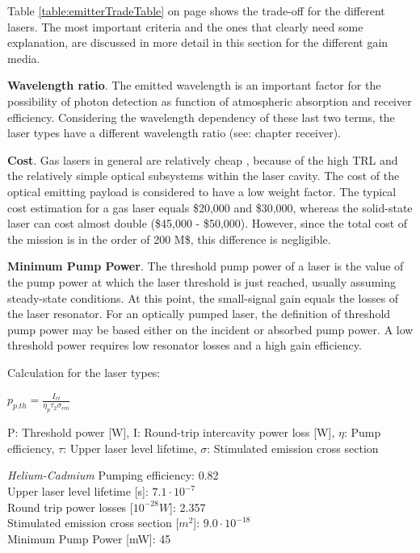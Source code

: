 Table \ref{table:emitterTradeTable} on page \pageref{table:emitterTradeTable} shows the trade-off for the different \acs{laser}s. The most important  criteria and the ones that clearly need some explanation, are discussed in more detail in this section for the different gain media. 
	
\textbf{Wavelength ratio}. The emitted wavelength is an important factor for the possibility of photon detection as function of atmospheric absorption and receiver efficiency. Considering the wavelength dependency of these last two terms, the laser types have a different wavelength ratio (see: chapter receiver).

\textbf{Cost}. Gas \acs{laser}s in general are relatively cheap , because of the high \ac{TRL} and the relatively simple optical subsystems within the \acs{laser} cavity. The cost of the optical emitting payload is considered to have a low weight factor. The typical cost estimation for a gas \acs{laser} equals \$20,000 and \$30,000, whereas the solid-state \acs{laser} can cost almost double (\$45,000 - \$50,000). However, since the total cost of the mission is in the order of 200 M\$, this difference is negligible.
 
\textbf{Minimum Pump Power}. \cite{lasertech}The threshold pump power of a laser is the value of the pump power at which the laser threshold is just reached, usually assuming steady-state conditions. At this point, the small-signal gain equals the losses of the laser resonator. For an optically pumped laser, the definition of threshold pump power may be based either on the incident or absorbed pump power. A low threshold power requires low resonator losses and a high gain efficiency.

Calculation for the \acs{laser} types:

\begin{center}
$p_{p.th} = \frac{I_{rt}}{\eta_{p}\tau_{2}\sigma_{em}}$
\end{center}

P: Threshold power [W], I: Round-trip intercavity power loss [W], $\eta$: Pump efficiency, $\tau$: Upper laser level lifetime, $\sigma$: Stimulated emission cross section

\textit{Helium-Cadmium}
Pumping efficiency: 0.82\\
Upper \acs{laser} level lifetime [s]: $7.1\cdot10^{-7}$\\
Round trip power losses [$10^{-28} W$]: 2.357 \\
Stimulated emission cross section [$m^{2}$]: $9.0\cdot10^{-18}$\\
Minimum Pump Power [mW]: 45 

